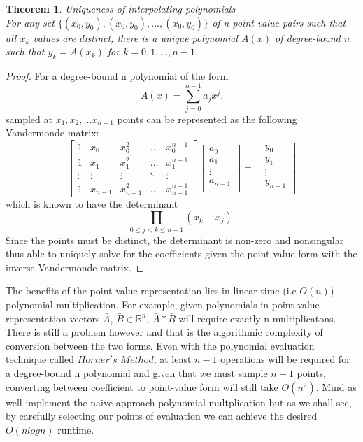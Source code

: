 \documentclass[11pt,leffttterpaper]{truthesis}
\newcommand{\R}{\mathbb{R}}
\theoremstyle{plain}
\newtheorem*{theorem*}{Theorem}
\begin{document}
\begin{theorem*}{Uniqueness of interpolating polynomials}
  $ $\\
  For any set \(\{(x_0,y_0),(x_0,y_0),...,(x_0,y_0)\}\) of n point-value
  pairs such that all \(x_k\) values are distinct, there is a unique
  polynomial \(A(x)\) of degree-bound $n$ such that \(y_k = A(x_k)\)
  for \(k = 0,1,...,n-1\).
\end{theorem*}
\begin{proof}
  For a degree-bound n polynomial of the form
  \[
    A(x) = \sum_{j = 0}^{n-1}a_jx^j.
  \]
  sampled at \(x_1,x_2,...x_{n-1}\) points can be represented as the
  following Vandermonde matrix:
  \[
    \begin{bmatrix}
      1 & x_{0} & x_{0}^2 & \dots  & x_{0}^{n-1} \\
      1 & x_{1} & x_{1}^2 & \dots  & x_{1}^{n-1} \\
      \vdots & \vdots & \vdots & \ddots & \vdots \\
      1 & x_{n-1} & x_{n-1}^2 & \dots  & x_{n-1}^{n-1}
    \end{bmatrix}
    \begin{bmatrix}
      a_0 \\
      a_1 \\
      \vdots \\
      a_{n-1} \\
    \end{bmatrix}
    =
    \begin{bmatrix}
      y_0 \\
      y_1 \\
      \vdots \\
      y_{n-1} \\
    \end{bmatrix}
  \]
  which is known to have the determinant
  \[
    \prod_{0\le j < k \le n-1}(x_k - x_j).
  \]
  Since the points must be distinct, the determinant is non-zero
  and nonsingular thus able to uniquely solve for the coefficients
  given the point-value form with the inverse Vandermonde matrix.
\end{proof}
The benefits of the point value representation lies in linear time
(i.e \(O(n)\)) polynomial multiplication. For example, given polynomials
in point-value representation vectors \(\bar{A}\), \(\bar{B} \in \R^n\),
\(\bar{A} * \bar{B}\) will require exactly n multiplicatons. There is
still a problem however and that is the algorithmic complexity of conversion
between the two forms. Even with the polynomial evaluation technique called $Horner's$
$Method$, at least \(n-1\) operations will be required for a degree-bound n
polynomial and given that we must sample \(n-1\) points, converting between
coefficient to point-value form will still take \(O(n^2)\). Mind as well
implement the naive approach polynomial multplication but as we shall
see, by carefully selecting our points of evaluation we can achieve
the desired \(O(nlogn)\) runtime.
\end{document}
